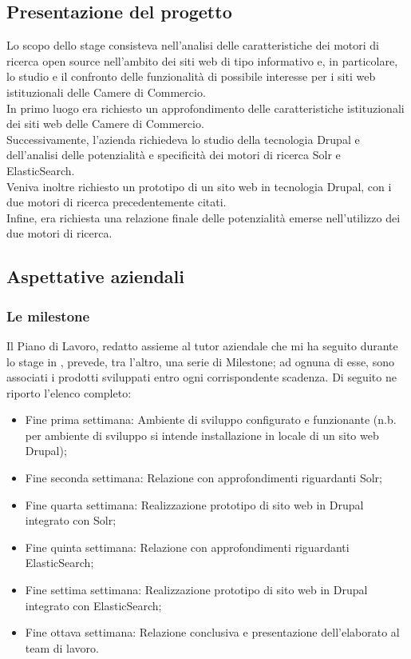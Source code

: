 	\subsection{Presentazione del progetto}
	Lo scopo dello stage consisteva nell'analisi delle caratteristiche dei motori di ricerca \gls{open source} nell'ambito dei siti web di tipo informativo e, in particolare, lo studio e il confronto delle funzionalità di possibile interesse per i siti web istituzionali delle Camere di Commercio. \\
	In primo luogo era richiesto un approfondimento delle caratteristiche istituzionali dei siti web delle Camere di Commercio. \\
	Successivamente, l'azienda richiedeva lo studio della tecnologia \gls{Drupal} e dell'analisi delle potenzialità e specificità dei motori di ricerca \gls{Solr} e \gls{ElasticSearch}. \\
	Veniva inoltre richiesto un prototipo di un sito web in tecnologia \gls{Drupal}, con i due motori di ricerca precedentemente citati. \\
	Infine, era richiesta una relazione finale delle potenzialità emerse nell'utilizzo dei due motori di ricerca. \\
	
	\subsection{Aspettative aziendali}
	
		\subsubsection{Le milestone}
		Il Piano di Lavoro, redatto assieme al tutor aziendale che mi ha seguito durante lo stage in \nomeAzienda, prevede, tra l'altro, una serie di \gls{Milestone}; ad ognuna di esse, sono associati i prodotti sviluppati entro ogni corrispondente scadenza. Di seguito ne riporto l'elenco completo:
		
		\begin{itemize}
			\item {Fine prima settimana: Ambiente di sviluppo configurato e funzionante (n.b. per ambiente di sviluppo si intende installazione in locale di un sito web \gls{Drupal});}
			\item {Fine seconda settimana: Relazione con approfondimenti riguardanti \gls{Solr};}
			\item {Fine quarta settimana: Realizzazione prototipo di sito web in \gls{Drupal} integrato con \gls{Solr};}
			\item {Fine quinta settimana: Relazione con approfondimenti riguardanti \gls{ElasticSearch};}
			\item {Fine settima settimana: Realizzazione prototipo di sito web in \gls{Drupal} integrato con \gls{ElasticSearch};}
			\item {Fine ottava settimana: Relazione conclusiva e presentazione dell’elaborato al team di lavoro.}		
		\end{itemize}

